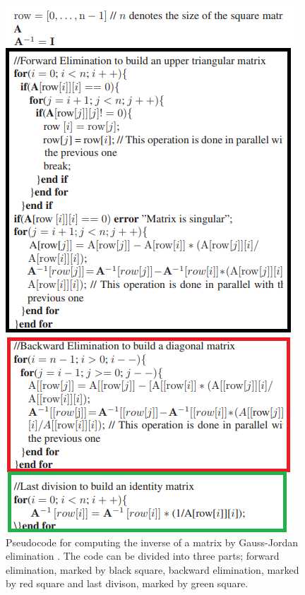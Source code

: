 \begin{figure}[H]
\centering
   \includegraphics[scale=0.6]{images/gauss_jordan_pseudocode.png}
  \caption{ Pseudocode for computing the inverse of a matrix by Gauss-Jordan elimination \cite{gauss_jordan_fpga}. The code can be divided into three parts; forward elimination, marked by black square, backward elimination, marked by red square and last divison, marked by green square. } 
  \label{fig:gauss_jordan_pseudocode}
\end{figure}